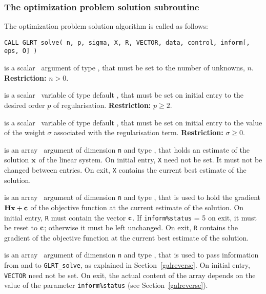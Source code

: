 \documentclass{galahad}
\newcommand{\packagename}{GL\-RT}
\begin{document}

\subsubsection{The optimization problem solution subroutine}
The optimization problem solution algorithm is called as follows:

\hskip0.5in
{\tt CALL \packagename\_solve( n, p, sigma, X, R, VECTOR, data, control, inform[, eps, O] )}

\begin{description}

 is a scalar \intentin\ argument of type \integer, that must be
set to the number of unknowns, $n$. {\bf Restriction: } $n  >  0$.

 is a scalar \intentin\ variable of type default
\realdp,
that must be set on initial entry to the desired order $p$ of regularisation.
{\bf Restriction: } $p \geq 2$.

 is a scalar \intentin\ variable of type default
\realdp,
that must be set on initial entry
to the value of the weight $\sigma$ associated with the regularisation term.
{\bf Restriction: } $\sigma \geq 0$.

 is an array \intentinout\ argument of dimension {\tt n} and
type \realdp,
that holds an estimate of the solution ${\mathbf{x}}$ of the linear system.
On initial entry, {\tt X} need not be set.
It must not be changed between entries.
On exit, {\tt X} contains the current best estimate of the solution.

 is an array \intentinout\ argument of dimension {\tt n} and
type \realdp,
that is used to hold the gradient ${\mathbf{H}} {\mathbf{x}}  +  {\mathbf{c}}$ of the objective
function at the current estimate of the solution.
On initial entry, {\tt R} must contain the vector ${\mathbf{c}}$.
If {\tt inform\%status} = 5 on exit, it must be reset to  ${\mathbf{c}}$; otherwise
it must be left unchanged. On exit, {\tt R} contains the gradient of the
objective   function at the current best estimate of the solution.

 is an array \intentinout\ argument of dimension {\tt n}
and type \realdp,
that is used to pass information from and to {\tt \packagename\_solve},
as explained in Section~\ref{galreverse}.
On initial entry, {\tt VECTOR} need not be set. On exit, the actual content of
the array depends on the value of the parameter {\tt inform\%status}
(see Section~\ref{galreverse}).


\end{description}
\end{document}
